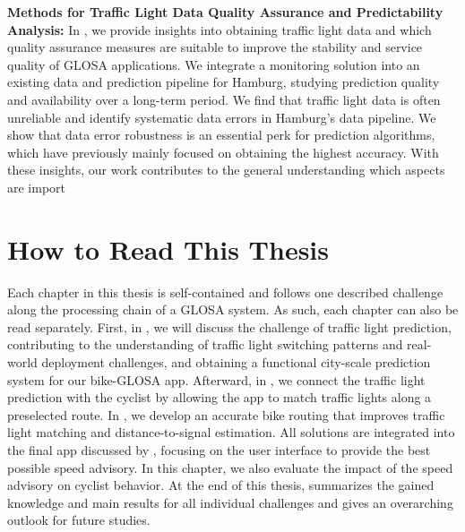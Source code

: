 \textbf{\color{cidarkblue}Methods for Traffic Light Data Quality Assurance and Predictability Analysis:} In , we provide insights into obtaining traffic light data and which quality assurance measures are suitable to improve the stability and service quality of GLOSA applications. We integrate a monitoring solution into an existing data and prediction pipeline for Hamburg, studying prediction quality and availability over a long-term period. We find that traffic light data is often unreliable and identify systematic data errors in Hamburg's data pipeline. We show that data error robustness is an essential perk for prediction algorithms, which have previously mainly focused on obtaining the highest accuracy. With these insights, our work contributes to the general understanding which aspects are import

\section{How to Read This Thesis}

Each chapter in this thesis is self-contained and follows one described challenge along the processing chain of a GLOSA system. As such, each chapter can also be read separately. First, in , we will discuss the challenge of traffic light prediction, contributing to the understanding of traffic light switching patterns and real-world deployment challenges, and obtaining a functional city-scale prediction system for our bike-GLOSA app. Afterward, in , we connect the traffic light prediction with the cyclist by allowing the app to match traffic lights along a preselected route. In , we develop an accurate bike routing that improves traffic light matching and distance-to-signal estimation. All solutions are integrated into the final app discussed by , focusing on the user interface to provide the best possible speed advisory. In this chapter, we also evaluate the impact of the speed advisory on cyclist behavior. At the end of this thesis,  summarizes the gained knowledge and main results for all individual challenges and gives an overarching outlook for future studies.
